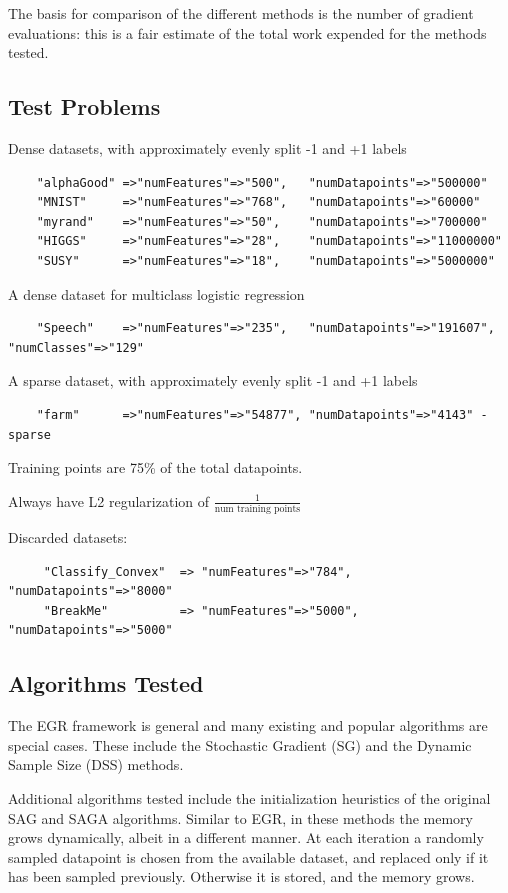 \documentclass[11pt]{article}
\begin{document}
 The basis for comparison of the different methods is the number of gradient evaluations: this is a fair estimate of the total work expended for the methods tested.
 
   \subsection{Test Problems}

   Dense datasets, with approximately evenly split -1 and +1 labels
   \begin{verbatim}
    "alphaGood" =>"numFeatures"=>"500",   "numDatapoints"=>"500000"
    "MNIST"     =>"numFeatures"=>"768",   "numDatapoints"=>"60000"
    "myrand"    =>"numFeatures"=>"50",    "numDatapoints"=>"700000"
    "HIGGS"     =>"numFeatures"=>"28",    "numDatapoints"=>"11000000"
    "SUSY"      =>"numFeatures"=>"18",    "numDatapoints"=>"5000000"
   \end{verbatim}

   A dense dataset for multiclass logistic regression
   \begin{verbatim}
    "Speech"    =>"numFeatures"=>"235",   "numDatapoints"=>"191607", "numClasses"=>"129"
   \end{verbatim}

   A sparse dataset, with approximately evenly split -1 and +1 labels 
   \begin{verbatim}
    "farm"      =>"numFeatures"=>"54877", "numDatapoints"=>"4143" - sparse
   \end{verbatim}

   Training points are 75\% of the total datapoints. 

   Always have L2 regularization of $\frac{1}{\mbox{num training points}}$

   Discarded datasets:
   \begin{verbatim}
     "Classify_Convex"  => "numFeatures"=>"784",  "numDatapoints"=>"8000"
     "BreakMe"          => "numFeatures"=>"5000", "numDatapoints"=>"5000"
   \end{verbatim}
   
   
   \subsection{Algorithms Tested}
   The EGR framework is general and many existing and popular algorithms are special cases. These include the Stochastic Gradient (SG) and the Dynamic Sample Size (DSS) methods. 
   
   Additional algorithms tested include the initialization heuristics of the original SAG and SAGA algorithms. Similar to EGR, in these methods the memory grows dynamically, albeit in a different manner. At each iteration a randomly sampled datapoint is chosen from the available dataset, and replaced only if it has been sampled previously. Otherwise it is stored, and the memory grows. 
\end{document}
